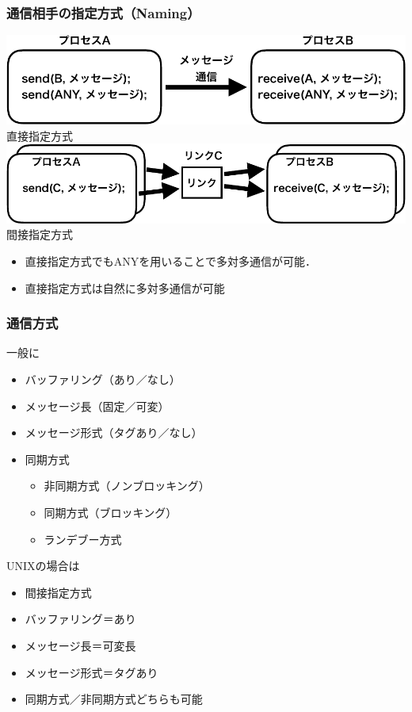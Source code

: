 \documentclass[dvipdfmx]{beamer}
\begin{document}
\begin{frame}
  \frametitle{通信相手の指定方式（Naming）}
  \begin{center}
    \includegraphics[scale=0.6]{Fig/ipcDirect-crop.pdf}\\
    直接指定方式
    \includegraphics[scale=0.6]{Fig/ipcIndirect-crop.pdf}\\
    間接指定方式
  \end{center}
  \begin{itemize}
  \item 直接指定方式でもANYを用いることで多対多通信が可能．
  \item 直接指定方式は自然に多対多通信が可能
  \end{itemize}
\end{frame}

\begin{frame}
  \frametitle{通信方式}
  一般に
  \begin{itemize}
  \item バッファリング（あり／なし）
  \item メッセージ長（固定／可変）
  \item メッセージ形式（タグあり／なし）
  \item 同期方式
    \begin{itemize}
    \item 非同期方式（ノンブロッキング）
    \item 同期方式（ブロッキング）
    \item ランデブー方式
    \end{itemize}
  \end{itemize}

  UNIXの場合は
  \begin{itemize}
  \item 間接指定方式
  \item バッファリング＝あり
  \item メッセージ長＝可変長
  \item メッセージ形式＝タグあり
  \item 同期方式／非同期方式どちらも可能
  \end{itemize}
\end{frame}
\end{document}
